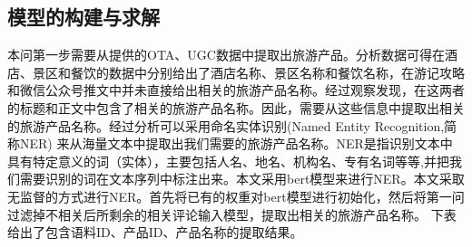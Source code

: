 \documentclass[bwprint]{gmcmthesis}
\begin{document}
\subsection{模型的构建与求解}
本问第一步需要从提供的OTA、UGC数据中提取出旅游产品。分析数据可得在酒店、景区和餐饮的数据中分别给出了酒店名称、景区名称和餐饮名称，在游记攻略和微信公众号推文中并未直接给出相关的旅游产品名称。经过观察发现，在这两者的标题和正文中包含了相关的旅游产品名称。因此，需要从这些信息中提取出相关的旅游产品名称。经过分析可以采用命名实体识别(Named Entity Recognition,简称NER) 来从海量文本中提取出我们需要的旅游产品名称。NER是指识别文本中具有特定意义的词（实体），主要包括人名、地名、机构名、专有名词等等,并把我们需要识别的词在文本序列中标注出来。本文采用bert模型来进行NER。本文采取无监督的方式进行NER。首先将已有的权重对bert模型进行初始化，然后将第一问过滤掉不相关后所剩余的相关评论输入模型，提取出相关的旅游产品名称。
下表给出了包含语料ID、产品ID、产品名称的提取结果。
\end{document}
